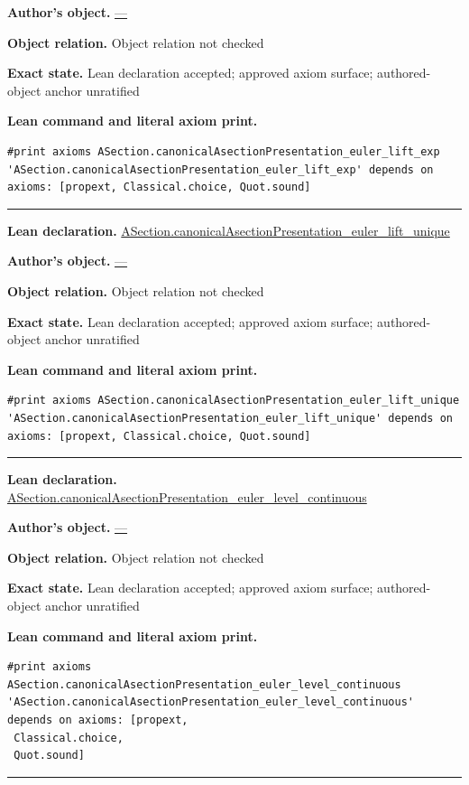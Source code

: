 \documentclass[11pt]{article}
\theoremstyle{plain}
\theoremstyle{definition}
\theoremstyle{remark}
\begin{document}
\begin{tcolorbox}
\par\textbf{Author's object.} \url{—}
\par\textbf{Object relation.} Object relation not checked
\par\textbf{Exact state.} Lean declaration accepted; approved axiom surface; authored-object anchor unratified
\par\smallskip\textbf{Lean command and literal axiom print.}
\begin{Verbatim}[breaklines=true,breakanywhere=true,fontsize=\small]
#print axioms ASection.canonicalAsectionPresentation_euler_lift_exp
'ASection.canonicalAsectionPresentation_euler_lift_exp' depends on axioms: [propext, Classical.choice, Quot.sound]
\end{Verbatim}
\medskip\hrule\medskip
\textbf{Lean declaration.} \url{ASection.canonicalAsectionPresentation_euler_lift_unique}
\par\textbf{Author's object.} \url{—}
\par\textbf{Object relation.} Object relation not checked
\par\textbf{Exact state.} Lean declaration accepted; approved axiom surface; authored-object anchor unratified
\par\smallskip\textbf{Lean command and literal axiom print.}
\begin{Verbatim}[breaklines=true,breakanywhere=true,fontsize=\small]
#print axioms ASection.canonicalAsectionPresentation_euler_lift_unique
'ASection.canonicalAsectionPresentation_euler_lift_unique' depends on axioms: [propext, Classical.choice, Quot.sound]
\end{Verbatim}
\medskip\hrule\medskip
\textbf{Lean declaration.} \url{ASection.canonicalAsectionPresentation_euler_level_continuous}
\par\textbf{Author's object.} \url{—}
\par\textbf{Object relation.} Object relation not checked
\par\textbf{Exact state.} Lean declaration accepted; approved axiom surface; authored-object anchor unratified
\par\smallskip\textbf{Lean command and literal axiom print.}
\begin{Verbatim}[breaklines=true,breakanywhere=true,fontsize=\small]
#print axioms ASection.canonicalAsectionPresentation_euler_level_continuous
'ASection.canonicalAsectionPresentation_euler_level_continuous' depends on axioms: [propext,
 Classical.choice,
 Quot.sound]
\end{Verbatim}
\medskip\hrule\medskip

\end{tcolorbox}
\end{document}
